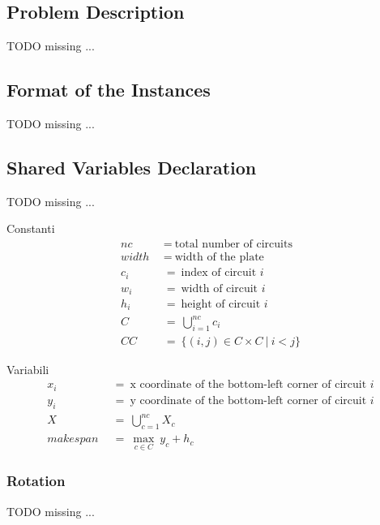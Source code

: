 
\subsection{Problem Description}
    \colorbox{BurntOrange}{TODO missing ...}


\subsection{Format of the Instances}
    \colorbox{BurntOrange}{TODO missing ...}


\subsection{Shared Variables Declaration}
    \colorbox{BurntOrange}{TODO missing ...}

    Constanti
    \begin{align*}
        nc\       &\ =\ \text{total number of circuits}    \\
        width\    &\ =\ \text{width of the plate}          \\
        c_i\      &\ =\ \text{index of circuit  } i        \\
        w_i\      &\ =\ \text{width of circuit  } i        \\
        h_i\      &\ =\ \text{height of circuit  } i       \\
        C\        &\ =\ \bigcup_{i=1}^{nc} c_i             \\
        CC\       &\ =\ \{(i, j) \in C \times C\ |\ i<j \}
    \end{align*}

    Variabili
    \begin{align*}
        x_i\      &\ =\ \text{x coordinate of the bottom-left corner of circuit  } i \\
        y_i\      &\ =\ \text{y coordinate of the bottom-left corner of circuit  } i \\
        X\        &\ =\ \bigcup_{c=1}^{nc} X_c \\
        makespan\ &\ =\ \max_{c \in C}\ y_c + h_c
    \end{align*}

    \subsubsection{Rotation}
        \colorbox{BurntOrange}{TODO missing ...}



